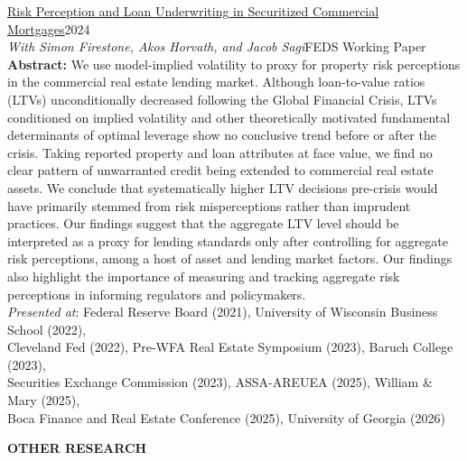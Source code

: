 \documentclass[a4paper]{article}
\newcommand{\lineunder} {
    \vspace*{-8pt} \\
    \hspace*{-18pt} \hrulefill \\
}
\newcommand{\header} [1] {
    {\hspace*{-18pt}\vspace*{1pt} \textbf{\MakeUppercase{#1}}}
    \lineunder
}
\begin{document}
\href{https://www.federalreserve.gov/econres/feds/risk-perception-and-loan-underwriting-in-securitized-commercial-mortgages.htm}{Risk Perception and Loan Underwriting in Securitized Commercial Mortgages}\hfill 2024\\
\textit{With Simon Firestone, Akos Horvath, and Jacob Sagi}\hfill{FEDS Working Paper}\\
\vspace{3mm}
\textbf{Abstract:} We use model-implied volatility to proxy for property risk perceptions in the commercial real estate lending market. Although loan-to-value ratios (LTVs) unconditionally decreased following the Global Financial Crisis, LTVs conditioned on implied volatility and other theoretically motivated fundamental determinants of optimal leverage show no conclusive trend before or after the crisis. Taking reported property and loan attributes at face value, we find no clear pattern of unwarranted credit being extended to commercial real estate assets. We conclude that systematically higher LTV decisions pre-crisis would have primarily stemmed from risk misperceptions rather than imprudent practices. Our findings suggest that the aggregate LTV level should be interpreted as a proxy for lending standards only after controlling for aggregate risk perceptions, among a host of asset and lending market factors. Our findings also highlight the importance of measuring and tracking aggregate risk perceptions in informing regulators and policymakers.\\
\vspace{3mm}
\textit{Presented at}: Federal Reserve Board (2021), University of Wisconsin Business School (2022), \\ Cleveland Fed (2022), Pre-WFA Real Estate Symposium (2023), Baruch College (2023), \\ Securities Exchange Commission (2023), ASSA-AREUEA (2025), William \& Mary (2025), \\  Boca Finance and Real Estate Conference (2025), University of Georgia (2026)

\vspace{5mm}


\header{Other Research}
\vspace{1mm}
\end{document}
